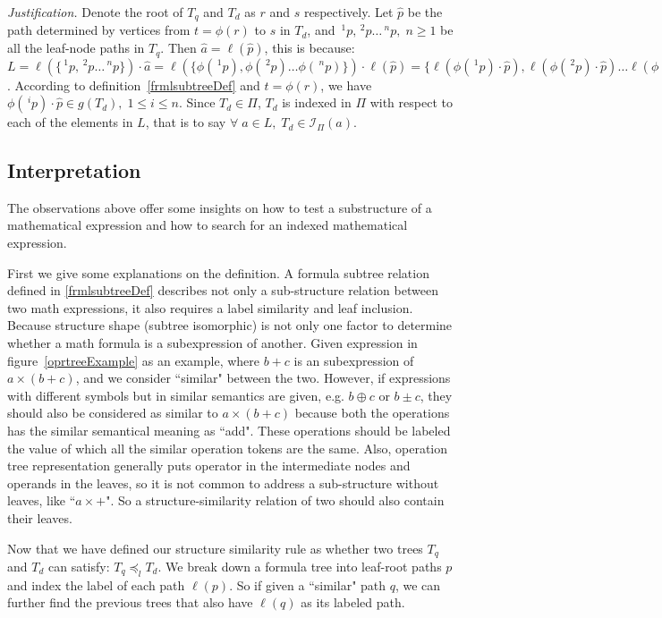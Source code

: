 \noindent \textit{Justification.} 
Denote the root of $T_q$ and $T_d$ as $r$ and $s$ respectively. 
Let $\hat{p}$ be the path determined by vertices from $t=\phi(r)$ to $s$ in $T_d$,
and $\,^1p, \,^2p \ldots \,^np,\; n \ge 1$ be all the leaf-node paths in $T_q$.
Then $\hat{a} = \ell(\hat{p})$, this is because:
$L = \ell(\{ \,^1p, \,^2p \ldots \,^np \}) \cdot \hat{a} = 
\ell(\{ \phi(\,^1p), \phi(\,^2p) \ldots \phi(\,^np) \}) \cdot \ell(\hat{p}) =
\{ \ell(\phi(\,^1p) \cdot \hat{p}), \ell(\phi(\,^2p) \cdot \hat{p}) \ldots \ell(\phi(\,^np) \cdot \hat{p}) \}
$. 
According to definition~\ref{frmlsubtreeDef} and $t=\phi(r)$, we have $\phi(\,^ip) \cdot \hat{p} \in g(T_d),\; 1 \le i \le n$.
Since $ T_d \in \Pi$, $T_d$ is indexed in $\Pi$ with respect to each of the elements in $L$, that is to say $\forall\; a \in L, \; T_d \in \mathcal{I}_{\Pi}(a)$.

\subsection{Interpretation}
\label{labelinterp}
The observations above offer some insights on how to test a substructure of a mathematical expression and how to search for an indexed mathematical expression. 

First we give some explanations on the definition.
A formula subtree relation defined in \ref{frmlsubtreeDef} describes not only a sub-structure relation between two math expressions, it also requires a label similarity and leaf inclusion.
Because structure shape (subtree isomorphic) is not only one factor to determine whether a math formula is a subexpression of another. 
Given expression in figure~\ref{oprtreeExample} as an example, where $b+c$ is an subexpression of $a \times (b+c)$, and we consider ``similar" between the two.
However, if expressions with different symbols but in similar semantics are given, e.g. $b \oplus c$ or $b \pm c$, 
they should also be considered as similar to $a \times (b+c)$ because both the operations has the similar semantical meaning as ``add". 
These operations should be labeled the value of which all the similar operation tokens are the same. 
Also, operation tree representation generally puts operator in the intermediate nodes and operands in the leaves, so it is not common to address a sub-structure without leaves, like ``$a \times + $". So a structure-similarity relation of two should also contain their leaves.

Now that we have defined our structure similarity rule as whether two trees $T_q$ and $T_d$ can satisfy: $T_q \preceq_l T_d$. We break down a formula tree into leaf-root paths $p$ and index the label of each path $\ell(p)$. So if given a ``similar" path $q$, we can further find the previous trees that also have $\ell(q)$ as its labeled path.

